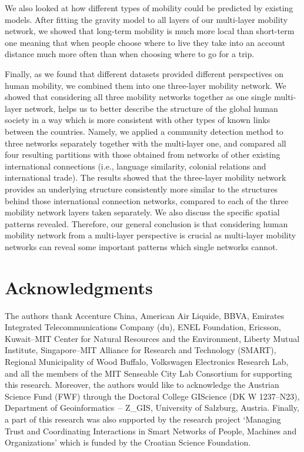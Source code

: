 \documentclass[aps,superscriptaddress,showkeys,nofootinbib]{revtex4-1}
\begin{document}
We also looked at how different types of mobility could be predicted by existing models. After fitting the gravity model to all layers of our multi-layer mobility network, we showed that long-term mobility is much more local than short-term one meaning that when people choose where to live they take into an account distance much more often than when choosing where to go for a trip.

Finally, as we found that different datasets provided different perspectives on human mobility, we combined them into one three-layer mobility network. We showed that considering all three mobility networks together as one single multi-layer network, helps us to better describe the structure of the global human society in a way which is more consistent with other types of known links between the countries. Namely, we applied a community detection method to three networks separately together with the multi-layer one, and compared all four resulting partitions with those obtained from networks of other existing international connections (i.e., language similarity, colonial relations and international trade). The results showed that the three-layer mobility network provides an underlying structure consistently more similar to the structures behind those international connection networks, compared to each of the three mobility network layers taken separately. We also discuss the specific spatial patterns revealed. Therefore, our general conclusion is that considering human mobility network from a multi-layer perspective is crucial as multi-layer mobility networks can reveal some important patterns which single networks cannot. 

\section*{Acknowledgments}
The authors thank Accenture China, American Air Liquide, BBVA, Emirates Integrated Telecommunications Company (du), ENEL Foundation, Ericsson, Kuwait--MIT Center for Natural Resources and the Environment, Liberty Mutual Institute, Singapore--MIT Alliance for Research and Technology (SMART), Regional Municipality of Wood Buffalo, Volkswagen Electronics Research Lab, and all the members of the MIT Senseable City Lab Consortium for supporting this research. Moreover, the authors would like to acknowledge the Austrian Science Fund (FWF) through the Doctoral College GIScience (DK W 1237--N23), Department of Geoinformatics~-- Z\_GIS, University of Salzburg, Austria. Finally, a part of this research was also supported by the research project `Managing Trust and Coordinating Interactions in Smart Networks of People, Machines and Organizations' which is funded by the Croatian Science Foundation.



\end{document}

